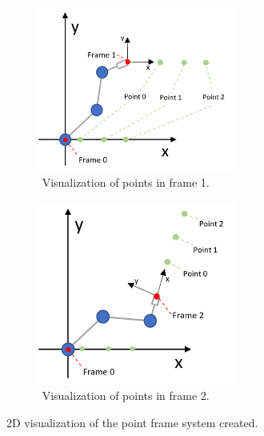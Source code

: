 \begin{figure}
    \centering
    \begin{subfigure}[b]{0.3\textwidth}
        \centering
        \includegraphics[width=6.5cm]{img/point_frame_explanation1.png}
        \caption{$ $ Visualization of points in frame 1.}
        \label{fig:overview__PF1}
    \end{subfigure}
    \hspace{3cm}
    \begin{subfigure}[b]{0.3\textwidth}
        \centering
        \includegraphics[width=6.5cm]{img/point_frame_explanation2.png}
        \caption{$ $ Visualization of points in frame 2.}
        \label{fig:overview__PF2}
    \end{subfigure}
       \caption{2D visualization of the point frame system created.}
       \label{fig:point_frame_explanation}
\end{figure}

